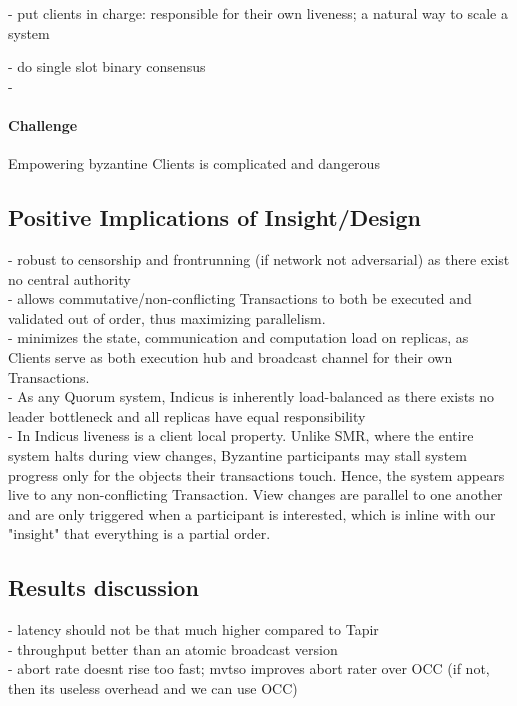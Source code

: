 - put clients in charge: responsible for their own liveness;  a natural way to scale a system\\

- do single slot binary consensus\\
-
\paragraph{Challenge} Empowering byzantine Clients is complicated and dangerous

\subsection{Positive Implications of Insight/Design}
- robust to censorship and frontrunning (if network not adversarial) as there exist no central authority \\
-  allows commutative/non-conflicting Transactions to both be executed and validated out of order, thus maximizing parallelism. \\
-  minimizes the state, communication and computation load on replicas, as Clients serve as both execution hub and broadcast channel for their own Transactions. \\
- As any Quorum system, Indicus is inherently load-balanced as there exists no leader bottleneck and all replicas have equal responsibility\\
- In Indicus liveness is a client local property. Unlike SMR, where the entire system halts during view changes, Byzantine participants may stall system progress only for the objects their transactions touch. Hence, the system appears live to any non-conflicting Transaction. View changes are parallel to one another and are only triggered when a participant is interested, which is inline with our "insight" that everything is a partial order.

\subsection{Results discussion}
- latency should not be that much higher compared to Tapir\\
- throughput better than an atomic broadcast version\\
- abort rate doesnt rise too fast; mvtso improves abort rater over OCC (if not, then its useless overhead and we can use OCC)


